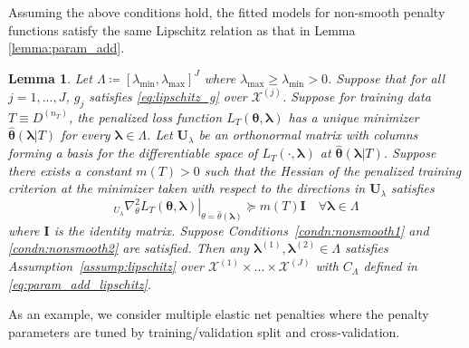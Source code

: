 \documentclass[12pt]{article} %
\newtheorem{lemma}{Lemma}
\theoremstyle{definition}
\begin{document}
Assuming the above conditions hold, the fitted models for non-smooth penalty functions satisfy the same Lipschitz relation as that in Lemma \ref{lemma:param_add}.

\begin{lemma}
	\label{lemma:nonsmooth}
	Let $\Lambda \coloneqq \left [ \lambda_{\min}, \lambda_{\max} \right ]^J$ where $\lambda_{\max} \ge \lambda_{\min} > 0$.
	Suppose that for all $j = 1,...,J$, $g_j$ satisfies \eqref{eq:lipschitz_g} over $\mathcal{X}^{(j)}$.
	Suppose for training data $T\equiv D^{(n_{T})}$, the penalized loss function $L_{T}\left(\boldsymbol{\theta},\boldsymbol{\lambda}\right)$
	has a unique minimizer $\hat{\boldsymbol{\theta}}(\boldsymbol{\lambda}|T)$
	for every $\boldsymbol{\lambda}\in\Lambda$.
	Let $\boldsymbol{U}_{\lambda}$
	be an orthonormal matrix with columns forming a basis for the differentiable
	space of $L_{T}(\cdot,\boldsymbol{\lambda})$ at $\hat{\boldsymbol{\theta}}(\boldsymbol{\lambda}|T)$.
	Suppose there exists a constant $m(T)>0$ such that the Hessian of
	the penalized training criterion at the minimizer taken with respect
	to the directions in $\boldsymbol{U}_{\lambda}$ satisfies 
	\begin{equation}
	\left._{U_{\lambda}}\nabla_{\theta}^{2}L_{T}(\boldsymbol{\theta},\boldsymbol{\lambda})\right|_{\theta=\hat{\theta}(\boldsymbol{\lambda})}\succeq m(T)\boldsymbol{I}\quad\forall\boldsymbol{\lambda}\in\Lambda
	\end{equation}
	where \textup{$\boldsymbol{I}$ is the identity matrix.}
	Suppose Conditions~\ref{condn:nonsmooth1} and \ref{condn:nonsmooth2} are satisfied.
	Then any $\boldsymbol{\lambda}^{(1)}, \boldsymbol{\lambda}^{(2)} \in \Lambda$ satisfies Assumption~\ref{assump:lipschitz} over $\mathcal{X}^{(1)} \times ... \times \mathcal{X}^{(J)}$ with $C_\Lambda$ defined in \eqref{eq:param_add_lipschitz}.
\end{lemma}

\noindent As an example, we consider multiple elastic net penalties where the penalty parameters are tuned by training/validation split and cross-validation.
\end{document}
